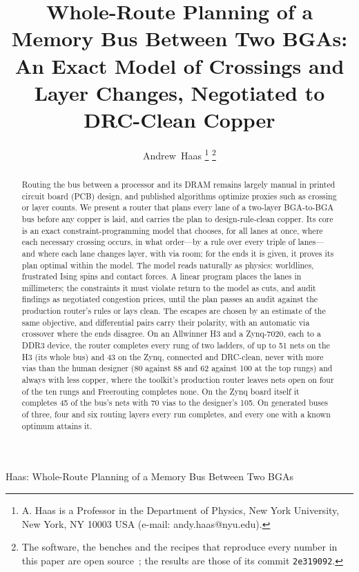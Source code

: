 \documentclass[journal]{IEEEtran}
\newcommand{\krtcommit}{2e319092}
\begin{document}
\title{Whole-Route Planning of a Memory Bus Between Two BGAs: An Exact Model of Crossings and Layer Changes, Negotiated to DRC-Clean Copper}

\author{Andrew~Haas%
\thanks{A. Haas is a Professor in the Department of Physics, New York University, New York, NY 10003 USA (e-mail: andy.haas@nyu.edu).}%
\thanks{The software, the benches and the recipes that reproduce every number in this paper are open source~\cite{krt}; the results are those of its commit \texttt{\krtcommit}.}}

%
{Haas: Whole-Route Planning of a Memory Bus Between Two BGAs}

\maketitle

\begin{abstract}
Routing the bus between a processor and its DRAM remains largely manual in printed circuit board (PCB) design, and published algorithms optimize proxies such as crossing or layer counts. We present a router that plans every lane of a two-layer BGA-to-BGA bus before any copper is laid, and carries the plan to design-rule-clean copper. Its core is an exact constraint-programming model that chooses, for all lanes at once, where each necessary crossing occurs, in what order---by a rule over every triple of lanes---and where each lane changes layer, with via room; for the ends it is given, it proves its plan optimal within the model. The model reads naturally as physics: worldlines, frustrated Ising spins and contact forces. A linear program places the lanes in millimeters; the constraints it must violate return to the model as cuts, and audit findings as negotiated congestion prices, until the plan passes an audit against the production router's rules or lays clean. The escapes are chosen by an estimate of the same objective, and differential pairs carry their polarity, with an automatic via crossover where the ends disagree. On an Allwinner H3 and a Zynq-7020, each to a DDR3 device, the router completes every rung of two ladders, of up to 51 nets on the H3 (its whole bus) and 43 on the Zynq, connected and DRC-clean, never with more vias than the human designer (80 against 88 and 62 against 100 at the top rungs) and always with less copper, where the toolkit's production router leaves nets open on four of the ten rungs and Freerouting completes none. On the Zynq board itself it completes 45 of the bus's nets with 70 vias to the designer's 105. On generated buses of three, four and six routing layers every run completes, and every one with a known optimum attains it.
\end{abstract}
\end{document}
